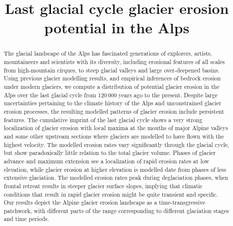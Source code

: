 \documentclass[esurf, manuscript]{copernicus}
\title{Last glacial cycle glacier erosion potential in the Alps}
\affil[1]{Independent scholar, Anafi, Greece}
\affil[2]{Institute of Earth Surface Dynamics, University of Lausanne, Switzerland}
\begin{document}

\maketitle

\begin{abstract}

    The glacial landscape of the Alps has fascinated generations of explorers,
    artists, mountaineers and scientists with its diversity, including
    erosional features of all scales from high-mountain cirques, to steep
    glacial valleys and large over-deepened basins. Using previous glacier
    modelling results, and empirical inferences of bedrock erosion under modern
    glaciers, we compute a distribution of potential glacier erosion in the Alps
    over the last glacial cycle from 120\,000 years ago to the present.
    Despite large uncertainties pertaining to the climate history of the Alps and
    unconstrained glacier erosion processes, the resulting modelled patterns of
    glacier erosion include persistent features. The cumulative imprint of
    the last glacial cycle shows a very strong localization of glacier erosion
    with local maxima at the mouths of major Alpine valleys and some other
    upstream sections where glaciers are modelled to have flown with the
    highest velocity. The modelled erosion rates vary significantly through the
    glacial cycle, but show paradoxically little relation to the total glacier
    volume. Phases of glacier advance and maximum extension see a localization
    of rapid erosion rates
    at low elevation, while glacier erosion at higher elevation is modelled
    date from phases of less extensive glaciation. The modelled erosion rates
    peak during deglaciation phases, when frontal retreat results in steeper
    glacier surface slopes, implying that climatic conditions that result in
    rapid glacier erosion might be quite transient and specific.
    Our results depict the Alpine glacier erosion landscape as a
    time-transgressive patchwork, with different parts of the
    range corresponding to different glaciation stages and time
    periods.

\end{abstract}


\introduction
\end{document}
